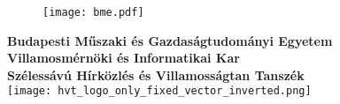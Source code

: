 \begin{titlepage}

\begin{figure}
\centering
\texttt{[image: bme.pdf]}
\end{figure}

\centering
\textbf{Budapesti Műszaki és Gazdaságtudományi Egyetem}\\
\textbf{Villamosmérnöki és Informatikai Kar}\\
\textbf{Szélessávú Hírközlés és Villamosságtan Tanszék}\\
\vspace{5mm}
\texttt{[image: hvt\_logo\_only\_fixed\_vector\_inverted.png]}  \\
\vspace{50mm}
\Huge
\dokumentumcim\\
\vspace{60mm}
\Large
\thetitle \\
\vspace{12mm}
\Large
\textbf{\theauthor}\\
\vspace{12mm}
\the\year


\end{titlepage}
